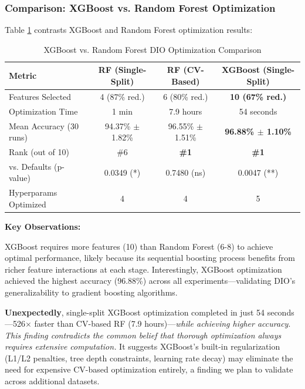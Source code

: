 \documentclass[12pt, a4paper]{article}
\begin{document}
\subsubsection{Comparison: XGBoost vs. Random Forest Optimization}
Table \ref{tab:xgb_rf_comparison} contrasts XGBoost and Random Forest optimization results:

\begin{table}[H]
    \centering
    \caption{XGBoost vs. Random Forest DIO Optimization Comparison}
    \label{tab:xgb_rf_comparison}
    \begin{tabular}{lccc}
        \toprule
        \textbf{Metric} & \textbf{RF (Single-Split)} & \textbf{RF (CV-Based)} & \textbf{XGBoost (Single-Split)} \\
        \midrule
        Features Selected & 4 (87\% red.) & 6 (80\% red.) & \textbf{10 (67\% red.)} \\
        Optimization Time & 1 min & 7.9 hours & 54 seconds \\
        Mean Accuracy (30 runs) & 94.37\% $\pm$ 1.82\% & 96.55\% $\pm$ 1.51\% & \textbf{96.88\% $\pm$ 1.10\%} \\
        Rank (out of 10) & \#6 & \textbf{\#1} & \textbf{\#1} \\
        vs. Defaults (p-value) & 0.0349 (*) & 0.7480 (ns) & 0.0047 (**) \\
        Hyperparams Optimized & 4 & 4 & 5 \\
        \bottomrule
    \end{tabular}
\end{table}

\textbf{Key Observations:}

XGBoost requires more features (10) than Random Forest (6-8) to achieve optimal performance, likely because its sequential boosting process benefits from richer feature interactions at each stage. Interestingly, XGBoost optimization achieved the highest accuracy (96.88\%) across all experiments—validating DIO's generalizability to gradient boosting algorithms.

\textbf{Unexpectedly}, single-split XGBoost optimization completed in just 54 seconds—526$\times$ faster than CV-based RF (7.9 hours)—\textit{while achieving higher accuracy}. \textit{This finding contradicts the common belief that thorough optimization always requires extensive computation.} It suggests XGBoost's built-in regularization (L1/L2 penalties, tree depth constraints, learning rate decay) may eliminate the need for expensive CV-based optimization entirely, a finding we plan to validate across additional datasets.
\end{document}
